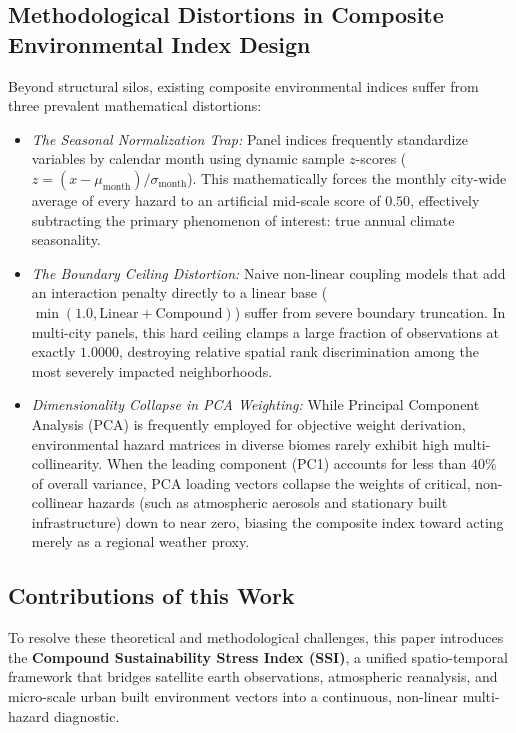 \subsection{Methodological Distortions in Composite Environmental Index Design}
Beyond structural silos, existing composite environmental indices suffer from three prevalent mathematical distortions:
\begin{itemize}
    \item \textit{The Seasonal Normalization Trap:} Panel indices frequently standardize variables by calendar month using dynamic sample $z$-scores ($z = (x - \mu_{\text{month}})/\sigma_{\text{month}}$). This mathematically forces the monthly city-wide average of every hazard to an artificial mid-scale score of $0.50$, effectively subtracting the primary phenomenon of interest: true annual climate seasonality.
    \item \textit{The Boundary Ceiling Distortion:} Naive non-linear coupling models that add an interaction penalty directly to a linear base ($\min(1.0, \text{Linear} + \text{Compound})$) suffer from severe boundary truncation. In multi-city panels, this hard ceiling clamps a large fraction of observations at exactly $1.0000$, destroying relative spatial rank discrimination among the most severely impacted neighborhoods.
    \item \textit{Dimensionality Collapse in PCA Weighting:} While Principal Component Analysis (PCA) is frequently employed for objective weight derivation, environmental hazard matrices in diverse biomes rarely exhibit high multi-collinearity. When the leading component (PC1) accounts for less than $40\%$ of overall variance, PCA loading vectors collapse the weights of critical, non-collinear hazards (such as atmospheric aerosols and stationary built infrastructure) down to near zero, biasing the composite index toward acting merely as a regional weather proxy.
\end{itemize}

\subsection{Contributions of this Work}
To resolve these theoretical and methodological challenges, this paper introduces the \textbf{Compound Sustainability Stress Index (SSI)}, a unified spatio-temporal framework that bridges satellite earth observations, atmospheric reanalysis, and micro-scale urban built environment vectors into a continuous, non-linear multi-hazard diagnostic. 


